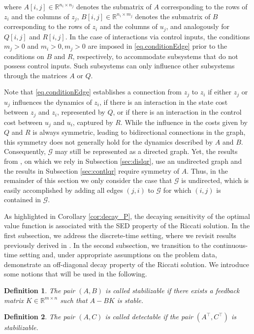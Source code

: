 \documentclass{article}
\newtheorem{definition}{Definition}[section]
\begin{document}
where $A[i,j] \in \mathbb{R}^{n_i \times n_j}$ denotes the submatrix of $A$ corresponding to the rows of $z_i$ and the columns of $z_j$, $B[i,j] \in \mathbb{R}^{n_i \times m_j}$ denotes the submatrix of $B$ corresponding to the rows of $z_i$ and the columns of $u_j$, and analogously for $Q[i,j]$ and $R[i,j]$. In the case of interactions via control inputs, the conditions \(m_j > 0\) and \(m_i > 0, m_j > 0\) are imposed in \eqref{eq.conditionEdge} prior to the conditions on \(B\) and \(R\), respectively, to accommodate subsystems that do not possess control inputs. Such subsystems can only influence other subsystems through the matrices $A$ or $Q$. 

Note that \eqref{eq.conditionEdge} establishes a connection from  $z_j$ to $z_i$ if either $z_j$ or $u_j$ influences the dynamics of $z_i$, if there is an interaction in the state cost between $z_j$ and $z_i$, represented by $Q$, or if there is an interaction in the control cost between $u_j$ and $u_i$, captured by $R$. While the influence in the costs given by $Q$ and $R$ is always symmetric, leading to bidirectional connections in the graph, this symmetry does not generally hold for the dynamics described by $A$ and $B$. Consequently, $\mathcal{G}$ may still be represented as a directed graph. Yet, the results from \cite{shin2022lqr}, on which we rely in Subsection \ref{sec:dislqr}, use an undirected graph and the results in Subsection \ref{sec:contlqr} require symmetry of $A$. Thus, in the remainder of this section we only consider the case that $\mathcal{G}$ is undirected, which is easily accomplished by adding all edges $(j,i)$ to $\mathcal{G}$ for which $(i,j)$ is contained in $\mathcal{G}$.

As highlighted in Corollary \ref{cor:decay_P}, the decaying sensitivity of the optimal value function is associated with the SED property of the Riccati solution. In the first subsection, we address the discrete-time setting, where we revisit results previously derived in \cite{sperl2023separable}. In the second subsection, we transition to the continuous-time setting and, under appropriate assumptions on the problem data, demonstrate an off-diagonal decay property of the Riccati solution. We introduce some notions that will be used in the following.
\begin{definition}
\label{def:stab}
The pair $(A,B)$ is called stabilizable if there exists
a feedback matrix $K \in \mathbb{R}^{m \times n}$ such that $A -B K$ is stable.
\end{definition}
\begin{definition}
\label{def:detect}
    The pair $(A,C)$ is called detectable if the pair $(A^\top, C^\top)$ is stabilizable.
\end{definition}
\end{document}
